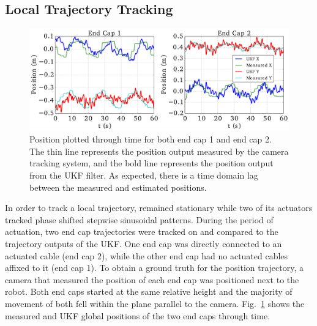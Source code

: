 {\subsection{Local Trajectory Tracking}
\begin{figure}[tpbh]
  \centering
  \includegraphics[width=1\linewidth]{tex/img/Node_tracking_1-11.pdf}
  \caption{Position plotted through time for both end cap 1 and end cap 2. The thin line represents the position output measured by the camera tracking system, and the bold line represents the position output from the UKF filter. As expected, there is a time domain lag between the measured and estimated positions.}
  \label{fig:smalldisplacement}
\end{figure}

In order to track a local trajectory, \SB{} remained stationary while two of its actuators tracked phase shifted stepwise sinusoidal patterns.
During the period of actuation, two end cap trajectories were tracked on \SB{} and compared to the trajectory outputs of the UKF.
One end cap was directly connected to an actuated cable (end cap 2), while the other end cap had no actuated cables affixed to it (end cap 1).
To obtain a ground truth for the position trajectory, a camera that measured the position of each end cap was positioned next to the robot.
Both end caps started at the same relative height and the majority of movement of both fell within the plane parallel to the camera.
Fig.~\ref{fig:smalldisplacement} shows the measured and UKF global positions of the two end caps through time.


}
